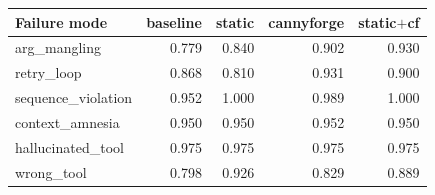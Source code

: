 \begin{tabular}{lrrrr}
\toprule
Failure mode & baseline & static & cannyforge & static$+$cf \\
\midrule
arg\_mangling    & 0.779 & 0.840 & 0.902 & 0.930 \\
retry\_loop      & 0.868 & 0.810 & 0.931 & 0.900 \\
sequence\_violation & 0.952 & 1.000 & 0.989 & 1.000 \\
context\_amnesia  & 0.950 & 0.950 & 0.952 & 0.950 \\
hallucinated\_tool & 0.975 & 0.975 & 0.975 & 0.975 \\
wrong\_tool       & 0.798 & 0.926 & 0.829 & 0.889 \\
\bottomrule
\end{tabular}
